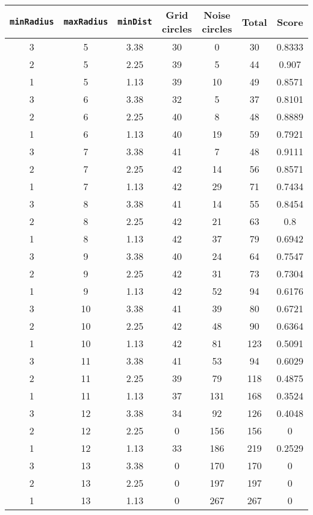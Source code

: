 \documentclass[letterpaper, 12pt]{article}
\begin{document}
\begin{longtable}{|c|c|c|c|c|c|c|}
\hline
\textbf{\texttt{minRadius}} & \textbf{\texttt{maxRadius}} & \textbf{\texttt{minDist}} & \textbf{Grid circles} & \textbf{Noise circles} & \textbf{Total} & \textbf{Score} \\
\hline
3 & 5 & 3.38 & 30 & 0 & 30 & 0.8333 \\
\hline
2 & 5 & 2.25 & 39 & 5 & 44 & 0.907 \\
\hline
1 & 5 & 1.13 & 39 & 10 & 49 & 0.8571 \\
\hline
3 & 6 & 3.38 & 32 & 5 & 37 & 0.8101 \\
\hline
2 & 6 & 2.25 & 40 & 8 & 48 & 0.8889 \\
\hline
1 & 6 & 1.13 & 40 & 19 & 59 & 0.7921 \\
\hline
3 & 7 & 3.38 & 41 & 7 & 48 & 0.9111 \\
\hline
2 & 7 & 2.25 & 42 & 14 & 56 & 0.8571 \\
\hline
1 & 7 & 1.13 & 42 & 29 & 71 & 0.7434 \\
\hline
3 & 8 & 3.38 & 41 & 14 & 55 & 0.8454 \\
\hline
2 & 8 & 2.25 & 42 & 21 & 63 & 0.8 \\
\hline
1 & 8 & 1.13 & 42 & 37 & 79 & 0.6942 \\
\hline
3 & 9 & 3.38 & 40 & 24 & 64 & 0.7547 \\
\hline
2 & 9 & 2.25 & 42 & 31 & 73 & 0.7304 \\
\hline
1 & 9 & 1.13 & 42 & 52 & 94 & 0.6176 \\
\hline
3 & 10 & 3.38 & 41 & 39 & 80 & 0.6721 \\
\hline
2 & 10 & 2.25 & 42 & 48 & 90 & 0.6364 \\
\hline
1 & 10 & 1.13 & 42 & 81 & 123 & 0.5091 \\
\hline
3 & 11 & 3.38 & 41 & 53 & 94 & 0.6029 \\
\hline
2 & 11 & 2.25 & 39 & 79 & 118 & 0.4875 \\
\hline
1 & 11 & 1.13 & 37 & 131 & 168 & 0.3524 \\
\hline
3 & 12 & 3.38 & 34 & 92 & 126 & 0.4048 \\
\hline
2 & 12 & 2.25 & 0 & 156 & 156 & 0 \\
\hline
1 & 12 & 1.13 & 33 & 186 & 219 & 0.2529 \\
\hline
3 & 13 & 3.38 & 0 & 170 & 170 & 0 \\
\hline
2 & 13 & 2.25 & 0 & 197 & 197 & 0 \\
\hline
1 & 13 & 1.13 & 0 & 267 & 267 & 0 \\

\end{longtable}
\end{document}
